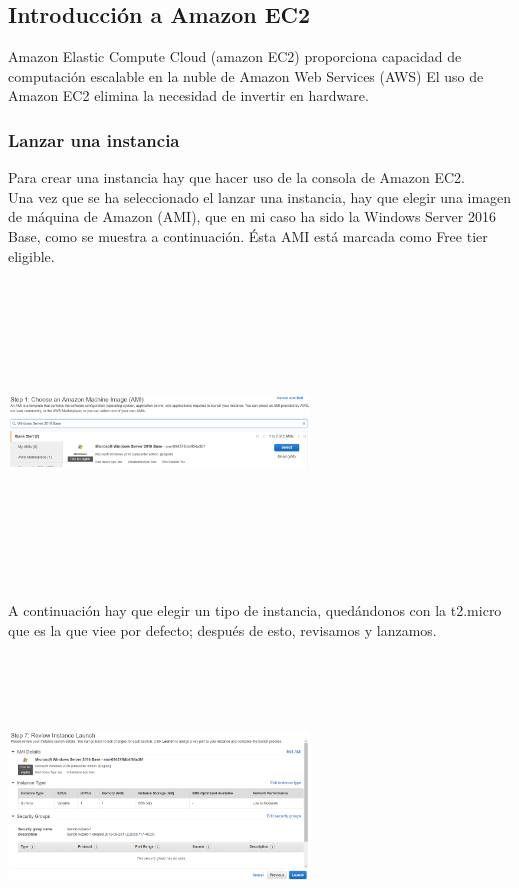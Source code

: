 \documentclass[english,runningheads,a4paper]{llncs}[2018/03/10]
\newenvironment{nscenter}
 {\parskip=0pt\par\nopagebreak\centering}
 {\par\noindent\ignorespacesafterend}
\begin{document}
\subsection*{Introducción a Amazon EC2}
Amazon Elastic Compute Cloud (amazon EC2) proporciona capacidad de computación 
escalable en la nuble de Amazon Web Services (AWS) El uso de Amazon EC2 elimina 
la necesidad de invertir en hardware.
\subsubsection*{Lanzar una instancia}
Para crear una instancia hay que hacer uso de la consola de Amazon EC2. \\
Una vez que se ha seleccionado el lanzar una instancia, hay que elegir una 
imagen de máquina de Amazon (AMI), que en mi caso ha sido la Windows Server 
2016 Base, como se muestra a continuación. Ésta AMI está marcada como Free tier 
eligible.
\newline
\begin{nscenter}
\includegraphics[width=8cm,height=8cm,keepaspectratio]{./Contenedores/AWS/33.png}
\end{nscenter}
\newline
A continuación hay que elegir un tipo de instancia, quedándonos con la t2.micro 
que es la que viee por defecto; después de esto, revisamos y lanzamos.
\newline
\begin{nscenter}
\includegraphics[width=8cm,height=8cm,keepaspectratio]{./Contenedores/AWS/34.png}
\end{nscenter}
\end{document}

